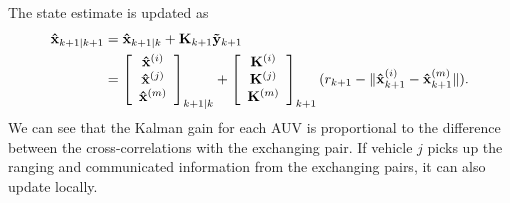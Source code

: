The state estimate is updated as
\begin{align}
\begin{split}
{\bf \hat x}_{k+1|k+1}&={\bf \hat x}_{k+1|k}+{\bf K}_{k+1}{\bf \tilde{y}}_{k+1}\\
&=\left[
              \begin{array}{c}
                {\bf \hat x}^{(i)} \\
                {\bf \hat x}^{(j)} \\
                {\bf \hat x}^{(m)} \\
              \end{array}
            \right]_{k+1|k}+\left[
              \begin{array}{c}
                {\bf K}^{(i)} \\
                {\bf K}^{(j)} \\
                {\bf K}^{(m)} \\
              \end{array}
            \right]_{k+1}(r_{k+1}-\|{\bf \hat x}^{(i)}_{k+1}-{\bf \hat x}^{(m)}_{k+1}\|).
\end{split}
\label{eq:AUV3updateEstimate}
\end{align}
We can see that the Kalman gain for each AUV is proportional to the difference between the cross-correlations with the exchanging pair. If vehicle $j$ picks up the ranging and communicated information from the exchanging pairs, it can also update locally. 

